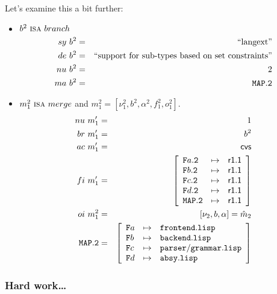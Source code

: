 \documentclass[fleqn, 10pt, a4paper]{article}
\begin{document}
Let's examine this a bit further:
\begin{itemize}
\item $b^2\ \mbox{\textsc{isa}}\ \mathnormal{branch}$
\begin{eqnarray*}
\mathnormal{sy}\ b^2 &=& \mbox{``langext''} \\
\mathnormal{de}\ b^2 &=& \mbox{``support for sub-types based on set constraints''} \\
\mathnormal{nu}\ b^2 &=& 2 \\
\mathnormal{ma}\ b^2 &=& \mathtt{MAP.2}
\end{eqnarray*}

\item $m_1^2\ \mbox{\textsc{isa}}\ \mathnormal{merge}$ and
$m_1^2=[\nu_1^2, b^2, \alpha^2, f_1^2, o_1^2]$.
\begin{eqnarray*}
\mathnormal{nu}\ m'_1 &=& 1 \\
\mathnormal{br}\ m'_1 &=& b^2 \\
\mathnormal{ac}\ m'_1 &=& \mathsf{cvs} \\
\mathnormal{fi}\ m'_1 &=& \left[
\begin{array}{lcl}
\mathtt{F}a\mathtt{.2} & \mapsto & \mathsf{r1.1} \\
\mathtt{F}b\mathtt{.2} & \mapsto & \mathsf{r1.1} \\
\mathtt{F}c\mathtt{.2} & \mapsto & \mathsf{r1.1} \\
\mathtt{F}d\mathtt{.2} & \mapsto & \mathsf{r1.1} \\
\mathtt{MAP.2}         & \mapsto & \mathsf{r1.1} \\
\end{array}\right] \\
\mathnormal{oi}\ m_1^2 &=& [\nu_2, b, \alpha] = \hat m_2 \\
\mathtt{MAP.2} &=& \left[
\begin{array}{lcl}
\mathtt{F}a &\mapsto& \mathtt{frontend.lisp} \\
\mathtt{F}b &\mapsto& \mathtt{backend.lisp} \\
\mathtt{F}c &\mapsto& \mathtt{parser/grammar.lisp} \\
\mathtt{F}d &\mapsto& \mathtt{absy.lisp} \\
\end{array}\right]
\end{eqnarray*}
\end{itemize}

\subsubsection{Hard work\ldots}
\end{document}
